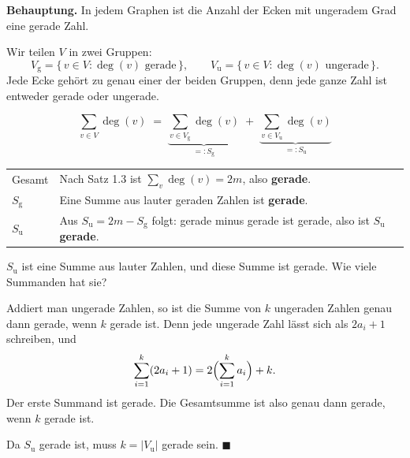 \begin{merksatz}
\textbf{Behauptung.} In jedem Graphen ist die Anzahl der Ecken mit ungeradem Grad eine gerade Zahl.

Wir teilen $V$ in zwei Gruppen:
\[ V_{\text{g}} = \{\, v \in V : \deg(v) \text{ gerade} \,\}, \qquad
   V_{\text{u}} = \{\, v \in V : \deg(v) \text{ ungerade} \,\} . \]
Jede Ecke gehört zu genau einer der beiden Gruppen, denn jede ganze Zahl ist entweder gerade oder ungerade.

\[ \sum_{v \in V} \deg(v) \;=\; \underbrace{\sum_{v \in V_{\text{g}}} \deg(v)}_{=: S_{\text{g}}} \;+\; \underbrace{\sum_{v \in V_{\text{u}}} \deg(v)}_{=: S_{\text{u}}} \]

\begin{center}
\renewcommand{\arraystretch}{1.5}
\begin{tabular}{@{}P{1.6cm}P{6.8cm}@{}}
\toprule
Gesamt & Nach Satz 1.3 ist $\sum_{v} \deg(v) = 2m$, also \textbf{gerade}.\\
$S_{\text{g}}$ & Eine Summe aus lauter geraden Zahlen ist \textbf{gerade}.\\
$S_{\text{u}}$ & Aus $S_{\text{u}} = 2m - S_{\text{g}}$ folgt: gerade minus gerade ist gerade, also ist $S_{\text{u}}$ \textbf{gerade}.\\
\bottomrule
\end{tabular}
\end{center}

$S_{\text{u}}$ ist eine Summe aus lauter  Zahlen, und diese Summe ist gerade. Wie viele Summanden hat sie?

Addiert man ungerade Zahlen, so ist die Summe von $k$ ungeraden Zahlen genau dann gerade, wenn $k$ gerade ist. Denn jede ungerade Zahl lässt sich als $2a_i + 1$ schreiben, und
\[ \sum_{i=1}^{k} (2a_i + 1) = 2\Bigl(\sum_{i=1}^{k} a_i\Bigr) + k . \]
Der erste Summand ist gerade. Die Gesamtsumme ist also genau dann gerade, wenn $k$ gerade ist.

Da $S_{\text{u}}$ gerade ist, muss $k = |V_{\text{u}}|$ gerade sein. $\blacksquare$
\end{merksatz}

